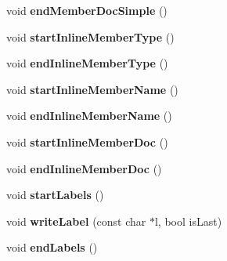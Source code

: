 \begin{DoxyCompactItemize}
\item 
\hypertarget{class_html_generator_aa630e29ae22b40def24a62d2586e8808}{void {\bfseries end\-Member\-Doc\-Simple} ()}\label{class_html_generator_aa630e29ae22b40def24a62d2586e8808}

\item 
\hypertarget{class_html_generator_a64d71adb23a46d9cd81eefa97d926cf6}{void {\bfseries start\-Inline\-Member\-Type} ()}\label{class_html_generator_a64d71adb23a46d9cd81eefa97d926cf6}

\item 
\hypertarget{class_html_generator_a908e01a4310b5e9fe1e6493a87c3f30e}{void {\bfseries end\-Inline\-Member\-Type} ()}\label{class_html_generator_a908e01a4310b5e9fe1e6493a87c3f30e}

\item 
\hypertarget{class_html_generator_a3307ae57ec582f244a790325900c1c96}{void {\bfseries start\-Inline\-Member\-Name} ()}\label{class_html_generator_a3307ae57ec582f244a790325900c1c96}

\item 
\hypertarget{class_html_generator_a41cbfeb50f86a4c1531e2012dbcbb209}{void {\bfseries end\-Inline\-Member\-Name} ()}\label{class_html_generator_a41cbfeb50f86a4c1531e2012dbcbb209}

\item 
\hypertarget{class_html_generator_a2a23f25caeb56aba89bc2b2c4147a2d2}{void {\bfseries start\-Inline\-Member\-Doc} ()}\label{class_html_generator_a2a23f25caeb56aba89bc2b2c4147a2d2}

\item 
\hypertarget{class_html_generator_a7a50d2a68d8d8805c86482012f422cba}{void {\bfseries end\-Inline\-Member\-Doc} ()}\label{class_html_generator_a7a50d2a68d8d8805c86482012f422cba}

\item 
\hypertarget{class_html_generator_aa1c00a079e425e24bbbb9291a698cbf2}{void {\bfseries start\-Labels} ()}\label{class_html_generator_aa1c00a079e425e24bbbb9291a698cbf2}

\item 
\hypertarget{class_html_generator_a4877c6f161162a399bf051570dee0c4a}{void {\bfseries write\-Label} (const char $\ast$l, bool is\-Last)}\label{class_html_generator_a4877c6f161162a399bf051570dee0c4a}

\item 
\hypertarget{class_html_generator_a26e386d6fcaae518c16e018bee486a61}{void {\bfseries end\-Labels} ()}\label{class_html_generator_a26e386d6fcaae518c16e018bee486a61}

\end{DoxyCompactItemize}

